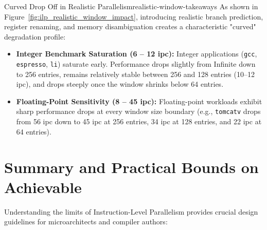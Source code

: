 \begin{observation}{Curved Drop Off in Realistic Parallelism}{realistic-window-takeaways}
As shown in Figure~\ref{fig:ilp_realistic_window_impact}, introducing realistic branch prediction, register renaming, and memory disambiguation creates a characteristic "curved" degradation profile:
\begin{itemize}
    \item \textbf{Integer Benchmark Saturation (6 -- 12 \gls{ipc}):} Integer applications (\texttt{gcc}, \texttt{espresso}, \texttt{li}) saturate early. Performance drops slightly from Infinite down to 256 entries, remains relatively stable between 256 and 128 entries (10--12 \gls{ipc}), and drops steeply once the window shrinks below 64 entries.
    \item \textbf{Floating-Point Sensitivity (8 -- 45 \gls{ipc}):} Floating-point workloads exhibit sharp performance drops at every window size boundary (e.g., \texttt{tomcatv} drops from 56 \gls{ipc} down to 45 \gls{ipc} at 256 entries, 34 \gls{ipc} at 128 entries, and 22 \gls{ipc} at 64 entries).
\end{itemize}
\end{observation}

\section{Summary and Practical Bounds on Achievable }
\label{sec:summary_ilp_bounds}

Understanding the limits of Instruction-Level Parallelism provides crucial design guidelines for microarchitects and compiler authors:

